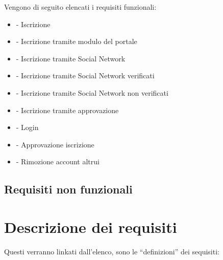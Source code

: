 \label{sub:requisiti_funzionali}
Vengono di seguito elencati i requisiti funzionali:
\begin{itemize} 
	\item {} - Iscrizione
	\item {} - Iscrizione tramite modulo del portale 
	\item {} - Iscrizione tramite Social Network
	\item {} - Iscrizione tramite Social Network verificati
	\item {} - Iscrizione tramite Social Network non verificati
	\item {} - Iscrizione tramite approvazione
	\item {} - Login 
	\countReset 
	\item {} - Approvazione iscrizione
	\item {} - Rimozione account altrui 
	\countReset
	

\end{itemize}	


\subsection{Requisiti non funzionali}
\label{sub:requisiti_non_funzionali}


\section{Descrizione dei requisiti}
\label{sec:descrizione_dei_requisiti}
Questi verranno linkati dall'elenco, sono le ``definizioni'' dei sequisiti:\\
 \\
 \\
 \\
 \\
 \\
\\
\\
\\
\\

